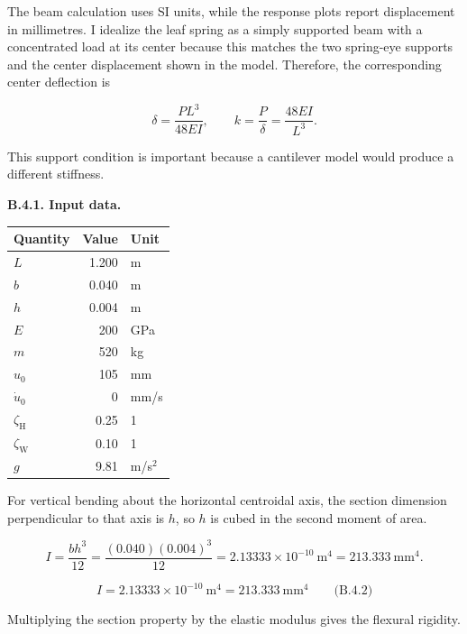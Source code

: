 \begingroup
\setlength{\abovedisplayskip}{6pt}
\setlength{\belowdisplayskip}{6pt}
\setlength{\abovedisplayshortskip}{4pt}
\setlength{\belowdisplayshortskip}{4pt}
\setlength{\intextsep}{6pt}

The beam calculation uses SI units, while the response plots report displacement in millimetres. I idealize the leaf spring as a simply supported beam with a concentrated load at its center because this matches the two spring-eye supports and the center displacement shown in the model. Therefore, the corresponding center deflection is

\[
\delta=\frac{PL^3}{48EI},
\qquad
k=\frac{P}{\delta}=\frac{48EI}{L^3}.
\]

This support condition is important because a cantilever model would produce a different stiffness.

\textbf{B.4.1. Input data.}

{ %
\begin{center}\small\begin{tabular}{@{}lrl@{}}
\toprule\noalign{}
Quantity & Value & Unit \\
\midrule\noalign{}
$L$ & 1.200 & m \\
$b$ & 0.040 & m \\
$h$ & 0.004 & m \\
$E$ & 200 & GPa \\
$m$ & 520 & kg \\
$u_0$ & 105 & mm \\
$\dot{u}_0$ & 0 & mm/s \\
$\zeta_{\mathrm{H}}$ & 0.25 & 1 \\
$\zeta_{\mathrm{W}}$ & 0.10 & 1 \\
$g$ & 9.81 & m/s$^2$ \\
\bottomrule\end{tabular}\end{center}
}

For vertical bending about the horizontal centroidal axis, the section dimension perpendicular to that axis is $h$, so $h$ is cubed in the second moment of area.

\[
I=\frac{bh^3}{12}
 =\frac{(0.040)(0.004)^3}{12}
 =2.13333\times10^{-10}\ \mathrm{m^4}
 =213.333\ \mathrm{mm^4}.
\]

\[
\boxed{I=2.13333\times10^{-10}\ \mathrm{m^4}=213.333\ \mathrm{mm^4}}
\qquad\text{(B.4.2)}
\]

Multiplying the section property by the elastic modulus gives the flexural rigidity.

